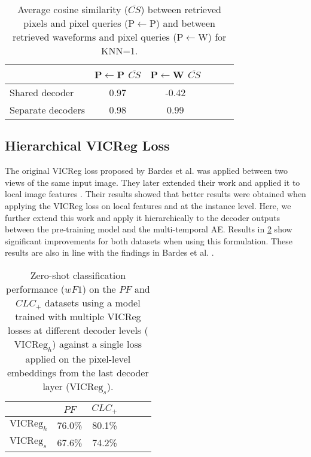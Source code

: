 \begin{table}[h]
\caption{Average cosine similarity ($\overline{CS}$) between retrieved pixels and pixel queries (P$\leftarrow$P) and between retrieved waveforms and pixel queries (P$\leftarrow$W) for KNN=1.\\ }
\label{table:dual_vs_single_decoder}
\centering
\begin{tabular}{lccccc}
\toprule
 & P$\leftarrow$P $\overline{CS}$ & P$\leftarrow$W $\overline{CS}$\\
\midrule
Shared decoder & 0.97 & -0.42\\
Separate decoders   & 0.98 & 0.99\\
\bottomrule
\end{tabular}
\end{table}

\subsection{Hierarchical VICReg Loss}
The original VICReg loss proposed by Bardes et al. \citeyear{bardes2021vicreg} was applied between two views of the same input image. They later extended their work and applied it to local image features \cite{bardes2022vicregl}. Their results showed that better results were obtained when applying the VICReg loss on local features and at the instance level. Here, we further extend this work and apply it hierarchically to the decoder outputs between the pre-training model and the multi-temporal AE. Results in \cref{table:zero_shot_diff_vicreg} show significant improvements for both datasets when using this formulation. These results are also in line with the findings in Bardes et al. \citeyear{bardes2022vicregl}.   

\begin{table}[h]
\caption{Zero-shot classification performance ($wF1$) on the $PF$ and $CLC_+$ datasets using a model trained with multiple VICReg losses at different decoder levels ($\text{VICReg}_h$) against a single loss applied on the pixel-level embeddings from the last decoder layer ($\text{VICReg}_s$).\\ }
\label{table:zero_shot_diff_vicreg}
\centering
\begin{tabular}{lccccc}
\toprule
 & $PF$ & $CLC_+$\\
\midrule
$\text{VICReg}_h$   & 76.0\% & 80.1\%\\
$\text{VICReg}_s$   & 67.6\% & 74.2\%\\
\bottomrule
\end{tabular}

\end{table}


